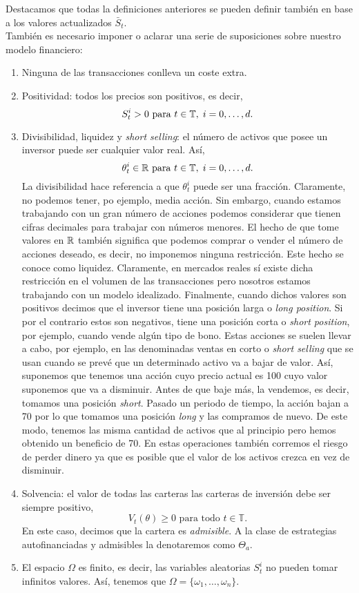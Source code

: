 Destacamos que todas la definiciones anteriores se pueden definir también en base a los valores actualizados $ \bar{S}_t $. \\

También es necesario imponer o aclarar una serie de suposiciones sobre nuestro modelo financiero:
\begin{enumerate}
	\item Ninguna de las transacciones conlleva un coste extra.
	\item Positividad: todos los precios son positivos, es decir,
	\[
	S_t^i > 0 \text{ para } t \in \mathbb{T},\hspace{1mm} i=0,\dots,d.
	\]
	\item Divisibilidad, liquidez y \textit{short selling}: el número de activos que posee un inversor puede ser cualquier valor real. Así,
	\[
	\theta_t^i \in \mathbb{R} \text{ para } t \in \mathbb{T},\hspace{1mm} i=0,\dots,d.
	\]
	La divisibilidad hace referencia a que $ \theta_t^i $ puede ser una fracción. Claramente, no podemos tener, po ejemplo, media acción. Sin embargo, cuando estamos trabajando con un gran número de acciones podemos considerar que tienen cifras decimales para trabajar con números menores. El hecho de que tome valores en $ \mathbb{R} $ también significa que podemos comprar o vender el número de acciones deseado, es decir, no imponemos ninguna restricción. Este hecho se conoce como liquidez. Claramente, en mercados reales sí existe dicha restricción en el volumen de las transacciones pero nosotros estamos trabajando con un modelo idealizado. Finalmente, cuando dichos valores son positivos decimos que el inversor tiene una posición larga o \textit{long position}. Si por el contrario estos son negativos, tiene una posición corta o \textit{short position}, por ejemplo, cuando vende algún tipo de bono. Estas acciones se suelen llevar a cabo, por ejemplo, en las denominadas ventas en corto o \textit{short selling} que se usan cuando se prevé que un determinado activo va a bajar de valor. Así, suponemos que tenemos una acción cuyo precio actual es 100 cuyo valor suponemos que va a disminuir. Antes de que baje más, la vendemos, es decir, tomamos una posición \textit{short}. Pasado un periodo de tiempo, la acción bajan a 70 por lo que tomamos una posición \textit{long} y las compramos de nuevo. De este modo, tenemos las misma cantidad de activos que al principio pero hemos obtenido un beneficio de 70. En estas operaciones también corremos el riesgo de perder dinero ya que es posible que el valor de los activos crezca en vez de disminuir. 
	
	\item Solvencia: el valor de todas las carteras las carteras de inversión debe ser siempre positivo,
	\[
	V_t (\theta) \geq 0\text{ para todo } t \in \mathbb{T}.
	\]
	En este caso, decimos que la cartera es \textit{admisible}. A la clase de estrategias autofinanciadas y admisibles la denotaremos como $ \Theta_a $.
	\item El espacio $ \Omega $ es finito, es decir, las variables aleatorias $ S_t^i $ no pueden tomar infinitos valores. Así, tenemos que $ \Omega = \{ \omega_1,\dots,\omega_n\} $.
\end{enumerate}

